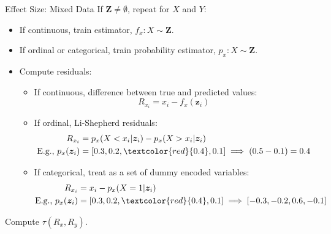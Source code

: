 \documentclass{beamer}
\begin{document}
\begin{frame}{Effect Size: Mixed Data}
	If $ \bm{Z} \ne \emptyset $, repeat for $ X $ and $ Y $:
		\begin{itemize}
			\item If continuous, train estimator, $ f_x: X \sim \bm{Z} $.
			\item If ordinal or categorical, train probability estimator, $ p_x: X \sim \bm{Z} $.
			\item Compute residuals:
			\begin{itemize}
				\item If continuous, difference between true and predicted values:
			 	$$ R_{x_i} = x_i - f_x(\bm{z}_i) $$
				\item If ordinal, Li-Shepherd residuals:
					\begin{equation*}
						\begin{split}
							R_{x_i} &= p_x(X < x_i | \bm{z}_i) - p_x(X > x_i | \bm{z}_i) \\
							\textnormal{E.g., } p_x(\bm{z}_i) &= [0.3, 0.2, \textcolor{red}{0.4}, 0.1] \implies (0.5 - 0.1) = 0.4 \\
						\end{split}
					\end{equation*}
				\item If categorical, treat as a set of dummy encoded variables:
				\begin{equation*}
					\begin{split}
						R_{x_i} &= x_i - p_x(X=1 | \bm{z}_i) \\
						\textnormal{E.g., } p_x(\bm{z}_i) &= [0.3, 0.2, \textcolor{red}{0.4}, 0.1] \implies [-0.3, -0.2, 0.6, -0.1] \\
					\end{split}
				\end{equation*}
			\end{itemize}
		\end{itemize}
	Compute $ \tau(R_x, R_y) $.
\end{frame}
\end{document}
